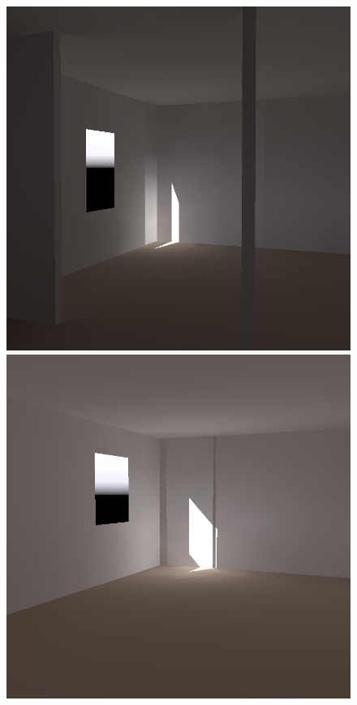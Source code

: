 \begin{figure}[t]
\includegraphics[width=\figwidth]{p2r_038_camera_chris_march.png} \hfill   %
\includegraphics[width=\figwidth]{p2r_042_camera_chris_march.png} \hfill   %

\end{figure}
